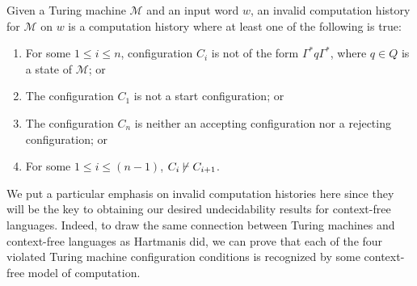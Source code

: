 \begin{definition}\label{def:invalidcomputationhistory}
Given a Turing machine $\mathcal{M}$ and an input word $w$, an invalid computation history for $\mathcal{M}$ on $w$ is a computation history where at least one of the following is true:
\begin{enumerate}
\item For some $1 \leq i \leq n$, configuration $C_{i}$ is not of the form $\Gamma^{*} q \Gamma^{*}$, where $q \in Q$ is a state of $\mathcal{M}$; or
\item The configuration $C_{1}$ is not a start configuration; or
\item The configuration $C_{n}$ is neither an accepting configuration nor a rejecting configuration; or
\item For some $1 \leq i \leq (n-1)$, $C_{i} \mkern-2mu\not\mkern2mu\vdash C_{i+1}$.
\end{enumerate}
\end{definition}

We put a particular emphasis on invalid computation histories here since they will be the key to obtaining our desired undecidability results for context-free languages. Indeed, to draw the same connection between Turing machines and context-free languages as Hartmanis did, we can prove that each of the four violated Turing machine configuration conditions is recognized by some context-free model of computation.


